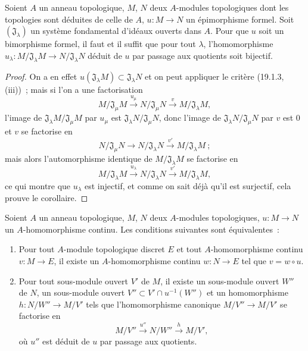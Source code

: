 \begin{corollary}[19.1.4]
\label{0.19.1.4-fr}
Soient $A$ un anneau topologique, $M$, $N$ deux $A$-modules topologiques dont
les topologies sont déduites de celle de $A$, $u:M\to N$ un épimorphisme
formel. Soit $(\mathfrak J_\lambda)$ un système fondamental d'idéaux ouverts
dans $A$. Pour que $u$ soit un bimorphisme formel, il faut et il suffit que pour
tout $\lambda$, l'homomorphisme
$u_\lambda:M/\mathfrak J_\lambda M\to N/\mathfrak J_\lambda N$ déduit de $u$
par passage aux quotients soit bijectif.
\end{corollary}

\begin{proof}
On a en effet $u(\mathfrak J_\lambda M)\subset\mathfrak J_\lambda N$ et on
peut appliquer le critère (19.1.3, (iii))~; mais si l'on a une factorisation
\[
  M/\mathfrak J_\mu M\xrightarrow{u_\mu}
  N/\mathfrak J_\mu N\xrightarrow{v}M/\mathfrak J_\lambda M,
\]
l'image de $\mathfrak J_\lambda M/\mathfrak J_\mu M$ par $u_\mu$ est
$\mathfrak J_\lambda N/\mathfrak J_\mu N$, donc l'image de
$\mathfrak J_\lambda N/\mathfrak J_\mu N$ par $v$ est 0 et $v$ se factorise en
\[
  N/\mathfrak J_\mu N\longrightarrow N/\mathfrak J_\lambda N
  \xrightarrow{v'}M/\mathfrak J_\lambda M~;
\]
mais alors l'automorphisme identique de $M/\mathfrak J_\lambda M$ se factorise
en
\[
  M/\mathfrak J_\lambda M\xrightarrow{u_\lambda}
  N/\mathfrak J_\lambda N\xrightarrow{v'}M/\mathfrak J_\lambda M,
\]
ce qui montre que $u_\lambda$ est injectif, et comme on sait déjà qu'il est
surjectif, cela prouve le corollaire.
\end{proof}

\begin{proposition}[19.1.5]
\label{0.19.1.5-fr}
Soient $A$ un anneau topologique, $M$, $N$ deux $A$-modules topologiques,
$u:M\to N$ un $A$-homomorphisme continu. Les conditions suivantes sont
équivalentes~:
\begin{enumerate}
  \item[a)] Pour tout $A$-module topologique discret $E$ et tout
  $A$-homomorphisme continu $v:M\to E$, il existe un $A$-homomorphisme continu
  $w:N\to E$ tel que $v=w\circ u$.
  \item[b)] Pour tout sous-module ouvert $V'$ de $M$, il existe un sous-module
  ouvert $W''$ de $N$, un sous-module ouvert
  $V''\subset V'\cap u^{-1}(W'')$ et un homomorphisme
  $h:N/W''\to M/V'$ tels que l'homomorphisme canonique
  $M/V''\to M/V'$ se factorise en
  \[
    M/V''\xrightarrow{u''}N/W''\xrightarrow{h}M/V',
  \]
  où $u''$ est déduit de $u$ par passage aux quotients.
\end{enumerate}
\end{proposition}

